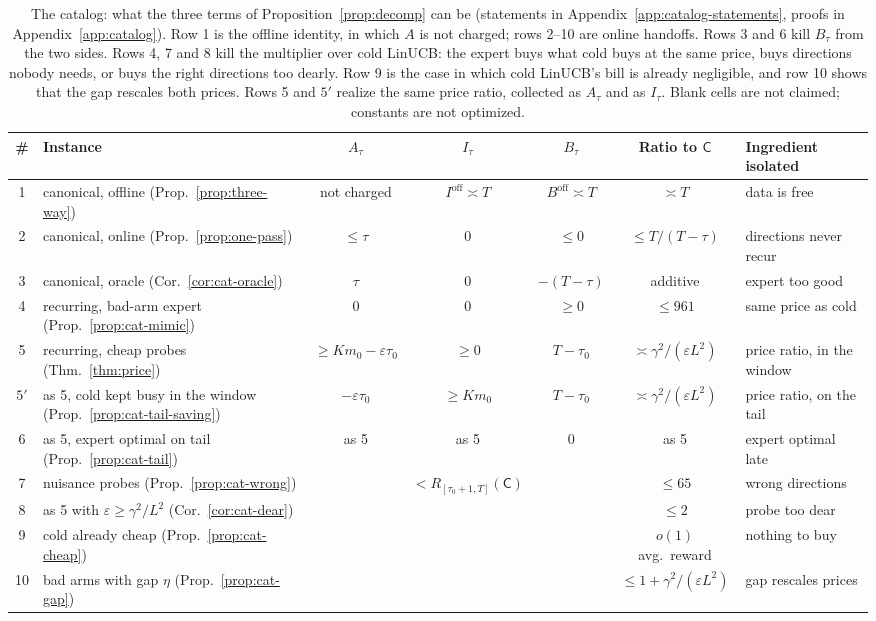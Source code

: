 \documentclass{article}
\theoremstyle{definition}
\theoremstyle{remark}
\newcommand{\eps}{\varepsilon}
\theoremstyle{remark}
\newcommand{\Cold}{\mathsf{C}}
\begin{document}
\begin{table}[t]
\centering
\scriptsize
\setlength{\tabcolsep}{2.5pt}
\begin{tabular}{@{}clccccl@{}}
\toprule
\# & Instance & $A_\tau$ & $I_\tau$ & $B_\tau$ & Ratio to $\Cold$ & Ingredient isolated\\
\midrule
1 & canonical, offline (Prop.~\ref{prop:three-way}) & not charged & $I^{\mathrm{off}}\asymp T$ & $B^{\mathrm{off}}\asymp T$ & $\asymp T$ & data is free\\
2 & canonical, online (Prop.~\ref{prop:one-pass}) & $\le\tau$ & $0$ & $\le0$ & $\le T/(T-\tau)$ & directions never recur\\
3 & canonical, oracle (Cor.~\ref{cor:cat-oracle}) & $\tau$ & $0$ & $-(T-\tau)$ & additive & expert too good\\
4 & recurring, bad-arm expert (Prop.~\ref{prop:cat-mimic}) & $0$ & $0$ & $\ge0$ & $\le961$ & same price as cold\\
5 & recurring, cheap probes (Thm.~\ref{thm:price}) & $\ge Km_0-\eps\tau_0$ & $\ge0$ & $T-\tau_0$ & $\asymp \gamma^2/(\eps L^2)$ & price ratio, in the window\\
$5'$ & as 5, cold kept busy in the window (Prop.~\ref{prop:cat-tail-saving}) & $-\eps\tau_0$ & $\ge Km_0$ & $T-\tau_0$ & $\asymp \gamma^2/(\eps L^2)$ & price ratio, on the tail\\
6 & as 5, expert optimal on tail (Prop.~\ref{prop:cat-tail}) & as 5 & as 5 & $0$ & as 5 & expert optimal late\\
7 & nuisance probes (Prop.~\ref{prop:cat-wrong}) & & $<R_{[\tau_0+1,T]}(\Cold)$ & & $\le65$ & wrong directions\\
8 & as 5 with $\eps\ge \gamma^2/L^2$ (Cor.~\ref{cor:cat-dear}) & & & & $\le2$ & probe too dear\\
9 & cold already cheap (Prop.~\ref{prop:cat-cheap}) & & & & $o(1)$ avg.\ reward & nothing to buy\\
10 & bad arms with gap $\eta$ (Prop.~\ref{prop:cat-gap}) & & & & $\le1+\gamma^2/(\eps L^2)$ & gap rescales prices\\
\bottomrule
\end{tabular}
\caption{The catalog: what the three terms of Proposition~\ref{prop:decomp}
can be (statements in Appendix~\ref{app:catalog-statements}, proofs in
Appendix~\ref{app:catalog}). Row 1 is the offline identity, in which $A$ is
not charged; rows 2--10 are online handoffs. Rows 3 and 6 kill $B_\tau$ from
the two sides. Rows 4, 7 and 8 kill the multiplier over cold LinUCB: the
expert buys what cold buys at the same price, buys directions nobody needs,
or buys the right directions too dearly. Row 9 is the case in which cold
LinUCB's bill is already negligible, and row 10 shows that the gap rescales
both prices. Rows 5 and $5'$ realize the same price ratio, collected as
$A_\tau$ and as $I_\tau$. Blank cells are not claimed; constants are not
optimized.}
\label{tab:catalog}
\end{table}
\end{document}
